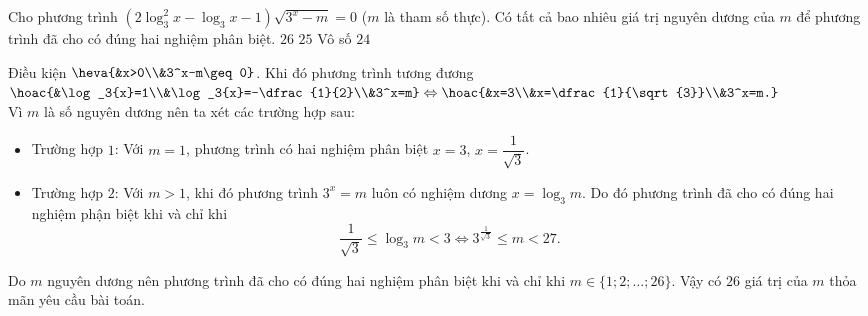 \begin{ex}
	Cho phương trình $\left(2\log_3^{2}x-\log_3x-1 \right)\sqrt{3^x-m}=0$ ($m$ là tham số thực). Có tất cả bao nhiêu giá trị nguyên dương của $m$ để phương trình đã cho có đúng hai nghiệm phân biệt.
	\choice
	{\True $26$}
	{$25$}
	{Vô số}
	{$24$}
	\loigiai
	{Điều kiện $\heva{&x>0\\&3^x-m\geq 0}$. Khi đó phương trình tương đương $\hoac{&\log_3{x}=1\\&\log_3{x}=-\dfrac{1}{2}\\&3^x=m} \Leftrightarrow \hoac{&x=3\\&x=\dfrac{1}{\sqrt{3}}\\&3^x=m.}$\\
		Vì $m$ là số nguyên dương nên ta xét các trường hợp sau:
		\begin{itemize}
			\item Trường hợp $1$: Với $m=1$, phương trình có hai nghiệm phân biệt $x=3$, $x=\dfrac{1}{\sqrt{3}}$.
			\item Trường hợp $2$: Với $m>1$, khi đó phương trình $3^x=m$ luôn có nghiệm dương $x=\log_3{m}$. Do đó phương trình đã cho có đúng hai nghiệm phận biệt khi và chỉ khi
			$$\dfrac{1}{\sqrt{3}}\leq \log_3{m}<3 \Leftrightarrow 3^{\tfrac{1}{\sqrt{3}}} \leq m <27.$$
		\end{itemize}
		Do $m$ nguyên dương nên phương trình đã cho có đúng hai nghiệm phân biệt khi và chỉ khi $m\in \{1;2;\ldots;26\}$. Vậy có $26$ giá trị của $m$ thỏa mãn yêu cầu bài toán.
	}
\end{ex}
